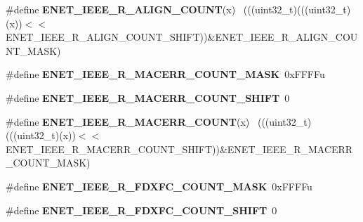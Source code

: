 \begin{DoxyCompactItemize}
\item 
\hypertarget{group___e_n_e_t___register___masks_ga2ae96fc3f0712a45b6de253503153b4f}{}\#define {\bfseries E\+N\+E\+T\+\_\+\+I\+E\+E\+E\+\_\+\+R\+\_\+\+A\+L\+I\+G\+N\+\_\+\+C\+O\+U\+N\+T}(x)                          ~(((uint32\+\_\+t)(((uint32\+\_\+t)(x))$<$$<$E\+N\+E\+T\+\_\+\+I\+E\+E\+E\+\_\+\+R\+\_\+\+A\+L\+I\+G\+N\+\_\+\+C\+O\+U\+N\+T\+\_\+\+S\+H\+I\+F\+T))\&E\+N\+E\+T\+\_\+\+I\+E\+E\+E\+\_\+\+R\+\_\+\+A\+L\+I\+G\+N\+\_\+\+C\+O\+U\+N\+T\+\_\+\+M\+A\+S\+K)\label{group___e_n_e_t___register___masks_ga2ae96fc3f0712a45b6de253503153b4f}

\item 
\hypertarget{group___e_n_e_t___register___masks_gaec114f8a37da297fa258d22d3d275def}{}\#define {\bfseries E\+N\+E\+T\+\_\+\+I\+E\+E\+E\+\_\+\+R\+\_\+\+M\+A\+C\+E\+R\+R\+\_\+\+C\+O\+U\+N\+T\+\_\+\+M\+A\+S\+K}~0x\+F\+F\+F\+Fu\label{group___e_n_e_t___register___masks_gaec114f8a37da297fa258d22d3d275def}

\item 
\hypertarget{group___e_n_e_t___register___masks_ga80d5b1a8081a8c2f0601dea66aeb5d04}{}\#define {\bfseries E\+N\+E\+T\+\_\+\+I\+E\+E\+E\+\_\+\+R\+\_\+\+M\+A\+C\+E\+R\+R\+\_\+\+C\+O\+U\+N\+T\+\_\+\+S\+H\+I\+F\+T}~0\label{group___e_n_e_t___register___masks_ga80d5b1a8081a8c2f0601dea66aeb5d04}

\item 
\hypertarget{group___e_n_e_t___register___masks_gade4178b7d53e780088a7f7299f6a1f17}{}\#define {\bfseries E\+N\+E\+T\+\_\+\+I\+E\+E\+E\+\_\+\+R\+\_\+\+M\+A\+C\+E\+R\+R\+\_\+\+C\+O\+U\+N\+T}(x)                        ~(((uint32\+\_\+t)(((uint32\+\_\+t)(x))$<$$<$E\+N\+E\+T\+\_\+\+I\+E\+E\+E\+\_\+\+R\+\_\+\+M\+A\+C\+E\+R\+R\+\_\+\+C\+O\+U\+N\+T\+\_\+\+S\+H\+I\+F\+T))\&E\+N\+E\+T\+\_\+\+I\+E\+E\+E\+\_\+\+R\+\_\+\+M\+A\+C\+E\+R\+R\+\_\+\+C\+O\+U\+N\+T\+\_\+\+M\+A\+S\+K)\label{group___e_n_e_t___register___masks_gade4178b7d53e780088a7f7299f6a1f17}

\item 
\hypertarget{group___e_n_e_t___register___masks_gae1bb815cfd879ec0c78889dfcb089247}{}\#define {\bfseries E\+N\+E\+T\+\_\+\+I\+E\+E\+E\+\_\+\+R\+\_\+\+F\+D\+X\+F\+C\+\_\+\+C\+O\+U\+N\+T\+\_\+\+M\+A\+S\+K}~0x\+F\+F\+F\+Fu\label{group___e_n_e_t___register___masks_gae1bb815cfd879ec0c78889dfcb089247}

\item 
\hypertarget{group___e_n_e_t___register___masks_ga31cd2bb10ff9c6d13dc7fede6f4d54d3}{}\#define {\bfseries E\+N\+E\+T\+\_\+\+I\+E\+E\+E\+\_\+\+R\+\_\+\+F\+D\+X\+F\+C\+\_\+\+C\+O\+U\+N\+T\+\_\+\+S\+H\+I\+F\+T}~0\label{group___e_n_e_t___register___masks_ga31cd2bb10ff9c6d13dc7fede6f4d54d3}


\end{DoxyCompactItemize}
